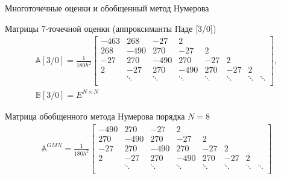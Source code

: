 \documentclass[10pt,pdf,hyperref={unicode},xcolor=dvipsnames]{beamer}
\newcommand{\bbA}{\mathbb{A}}
\newcommand{\bbB}{\mathbb{B}}
\begin{document}
\begin{frame}{Многоточечные оценки и обобщенный метод Нумерова}
    \begin{block}{Матрицы 7-точечной оценки (аппроксиманты Паде [3/0])}
        \begin{gather}
            \bbA[3/0] = \frac{1}{ 180 h^2} 
            \begin{bmatrix}
               -463 & 268    & -27    & 2     &        &        &         & \\
                268 & -490   & 270    & -27   & 2      &        &         & \\
                -27 & 270    & -490   & 270   & -27    & 2      &         & \\
                 2  & -27    & 270    &-490   & 270    & -27    & 2       & \\
                    & \ddots & \ddots &\ddots & \ddots & \ddots &  \ddots & \ddots \\
            \end{bmatrix}, \\
            \bbB[3/0] = E^{N \times N}
        \end{gather}
    \end{block}
    \begin{block}{Матрица обобщенного метода Нумерова порядка $N = 8$}
        \begin{gather}
            \bbA^{GMN} = \frac{1}{ 180 h^2} 
            \begin{bmatrix}
               -490 & 270    & -27    & 2     &        &        &         & \\
                270 & -490   & 270    & -27   & 2      &        &         & \\
                -27 & 270    & -490   & 270   & -27    & 2      &         & \\
                 2  & -27    & 270    &-490   & 270    & -27    & 2       & \\
                    & \ddots & \ddots &\ddots & \ddots & \ddots &  \ddots & \ddots \\
            \end{bmatrix}
        \end{gather}
    \end{block}
\end{frame}
\end{document}
